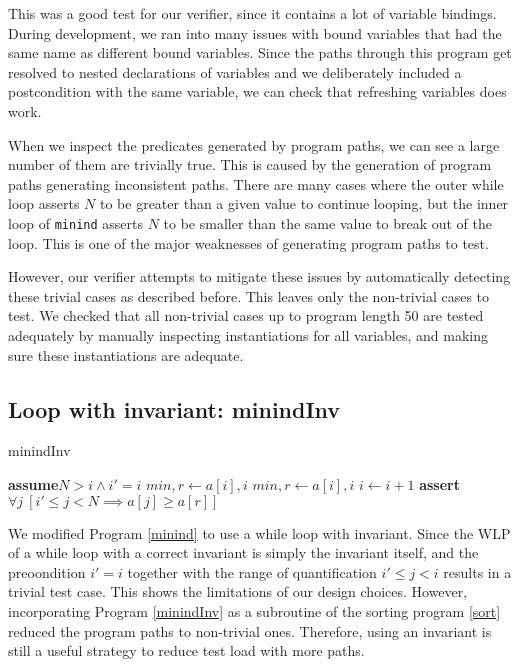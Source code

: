 \documentclass[a4paper]{article}
\newcommand{\Assert}{\State\textbf{assert}\xspace}
\newcommand{\Assume}{\State\textbf{assume}\xspace}
\begin{document}
This was a good test for our verifier, since it contains a lot of variable bindings. During development, we ran into many issues with bound variables that had the same name as different bound variables. Since the paths through this program get resolved to nested declarations of variables and we deliberately included a postcondition with the same variable, we can check that refreshing variables does work.

When we inspect the predicates generated by program paths, we can see a large number of them are trivially true. This is caused by the generation of program paths generating inconsistent paths. There are many cases where the outer while loop asserts $N$ to be greater than a given value to continue looping, but the inner loop of \texttt{minind} asserts $N$ to be smaller than the same value to break out of the loop. This is one of the major weaknesses of generating program paths to test.

However, our verifier attempts to mitigate these issues by automatically detecting these trivial cases as described before. This leaves only the non-trivial cases to test. We checked that all non-trivial cases up to program length 50 are tested adequately by manually inspecting instantiations for all variables, and making sure these instantiations are adequate.

\subsection{Loop with invariant: minindInv}

\begin{algorithm}
\caption{minindInv} \label{minindInv}
\begin{algorithmic}
\Assume $N > i \wedge i' = i$
	\State $\textit{min}, r \gets a[i], i$
			\State $\textit{min}, r \gets a[i], i$
		\EndIf
		\State $i \gets i+1$
	\EndWhile
\EndVar
\Assert $\forall j\ [i' \leq j < N \implies a[j] \geq a[r]]$
\end{algorithmic}
\end{algorithm}

We modified Program \ref{minind} to use a while loop with invariant. Since the WLP of a while loop with a correct invariant is simply the invariant itself, and the preoondition $i' = i$ together with the range of quantification $i' \leq j < i$ results in a trivial test case. This shows the limitations of our design choices. However, incorporating Program \ref{minindInv} as a subroutine of the sorting program \ref{sort} reduced the program paths to non-trivial ones. Therefore, using an invariant is still a useful strategy to reduce test load with more paths.
\end{document}
